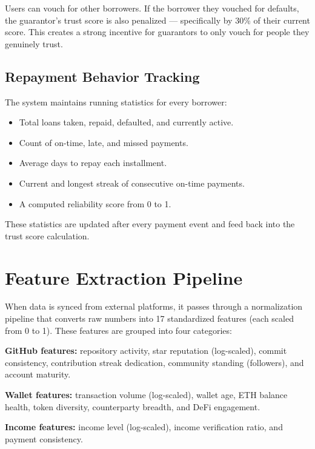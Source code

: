 \documentclass[12pt, a4paper]{article}
\begin{document}
Users can vouch for other borrowers. If the borrower they vouched for defaults, the guarantor's trust score is also penalized --- specifically by 30\% of their current score. This creates a strong incentive for guarantors to only vouch for people they genuinely trust.

\subsection{Repayment Behavior Tracking}

The system maintains running statistics for every borrower:
\begin{itemize}[nosep]
    \item Total loans taken, repaid, defaulted, and currently active.
    \item Count of on-time, late, and missed payments.
    \item Average days to repay each installment.
    \item Current and longest streak of consecutive on-time payments.
    \item A computed reliability score from 0 to 1.
\end{itemize}

These statistics are updated after every payment event and feed back into the trust score calculation.


\section{Feature Extraction Pipeline}

When data is synced from external platforms, it passes through a normalization pipeline that converts raw numbers into 17 standardized features (each scaled from 0 to 1). These features are grouped into four categories:

\textbf{GitHub features:} repository activity, star reputation (log-scaled), commit consistency, contribution streak dedication, community standing (followers), and account maturity.

\textbf{Wallet features:} transaction volume (log-scaled), wallet age, ETH balance health, token diversity, counterparty breadth, and DeFi engagement.

\textbf{Income features:} income level (log-scaled), income verification ratio, and payment consistency.
\end{document}
